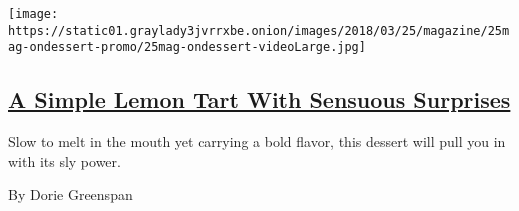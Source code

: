 \begin{enumerate}
  \texttt{[image: https://static01.graylady3jvrrxbe.onion/images/2018/03/25/magazine/25mag-ondessert-promo/25mag-ondessert-videoLarge.jpg]}

  \hypertarget{a-simple-lemon-tart-with-sensuous-surprises}{%
  \subsection{\texorpdfstring{\href{/2018/03/20/magazine/simple-lemon-tart-sweet-crust-recipe.html}{A
  Simple Lemon Tart With Sensuous
  Surprises}}{A Simple Lemon Tart With Sensuous Surprises}}\label{a-simple-lemon-tart-with-sensuous-surprises}}

  Slow to melt in the mouth yet carrying a bold flavor, this dessert
  will pull you in with its sly power.

  By Dorie Greenspan
\end{enumerate}

